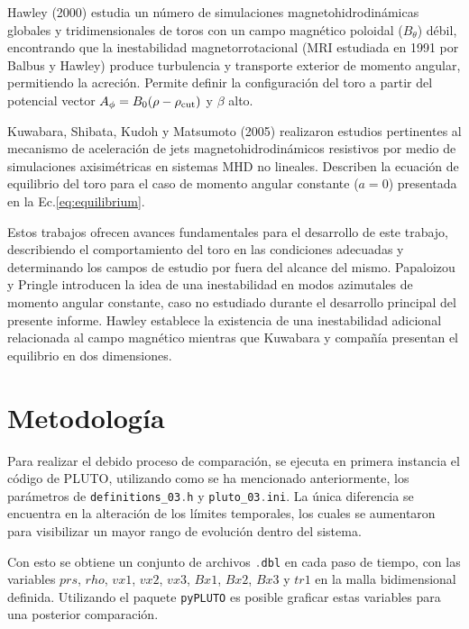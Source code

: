 \documentclass[11pt, letterpaper]{article}
\begin{document}
\medskip

Hawley (2000)\cite{Hawley} estudia un número de simulaciones magnetohidrodinámicas globales y tridimensionales de toros con un campo magnético poloidal ($B_\theta$) débil, encontrando que la inestabilidad magnetorrotacional (MRI estudiada en 1991 por Balbus y Hawley)\cite{HawleyMRI} produce turbulencia y transporte exterior de momento angular, permitiendo la acreción. Permite definir la configuración del toro a partir del potencial vector $A_\phi = B_0(\rho - \rho_{\rm cut})$ y $\beta$ alto.

\medskip

Kuwabara, Shibata, Kudoh y Matsumoto (2005)\cite{Kuwabara} realizaron estudios pertinentes al mecanismo de aceleración de jets magnetohidrodinámicos resistivos por medio de simulaciones axisimétricas en sistemas MHD no lineales. Describen la ecuación de equilibrio del toro para el caso de momento angular constante ($a = 0$) presentada en la Ec.\ref{eq:equilibrium}. 

\medskip

Estos trabajos ofrecen avances fundamentales para el desarrollo de este trabajo, describiendo el comportamiento del toro en las condiciones adecuadas y determinando los campos de estudio por fuera del alcance del mismo. Papaloizou y Pringle introducen la idea de una inestabilidad en modos azimutales de momento angular constante, caso no estudiado durante el desarrollo principal del presente informe. Hawley establece la existencia de una inestabilidad adicional relacionada al campo magnético mientras que Kuwabara y compañía presentan el equilibrio en dos dimensiones.

\section{Metodología}

Para realizar el debido proceso de comparación, se ejecuta en primera instancia el código de PLUTO, utilizando como se ha mencionado anteriormente, los parámetros de \lstinline[language=C]|definitions_03.h| y \lstinline[language=C]|pluto_03.ini|. La única diferencia se encuentra en la alteración de los límites temporales, los cuales se aumentaron para visibilizar un mayor rango de evolución dentro del sistema.

\medskip

Con esto se obtiene un conjunto de archivos \lstinline[language=C]|.dbl| en cada paso de tiempo, con las variables $prs$, $rho$, $vx1$, $vx2$, $vx3$, $Bx1$, $Bx2$, $Bx3$ y $tr1$ en la malla bidimensional definida. Utilizando el paquete \lstinline[language=C]|pyPLUTO| es posible graficar estas variables para una posterior comparación.
\end{document}
